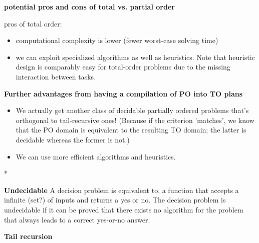 \textbf{potential pros and cons of total vs. partial order}
	\item pros of total order:
	\begin{itemize}
		\item computational complexity is lower (fewer worst-case solving time)
		\item we can exploit specialized algorithms as well as heuristics. Note that heuristic design is comparably easy for total-order problems due to the missing interaction between tasks.
\end{itemize}

\textbf{Further advantages from having a compilation of PO into TO plans}
\begin{itemize}
	\item We actually get another class of decidable partially ordered problems that's orthogonal to tail-recursive ones! (Because if the criterion 'matches', we know that the PO domain is equivalent to the resulting TO domain; the latter is decidable whereas the former is not.) 
	\item We can use more efficient algorithms and heuristics. 
\end{itemize}* 


\textbf{Undecidable } A decision problem is equivalent to, a function that accepts a infinite (set?) of inputs and returns a yes or no. The decision problem is undecidable if it can be proved that there exists no algorithm for the problem that always leads to a correct yes-or-no answer.

\textbf{Tail recursion}